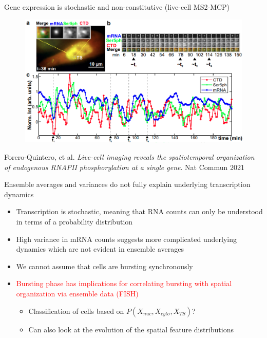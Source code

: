 \documentclass[aspectratio=1610]{beamer}					%
\begin{document}
\begin{frame}{Gene expression is stochastic and non-constitutive (live-cell MS2-MCP)}
\begin{figure}
\includegraphics[width=12cm]{live-cell.png}
\end{figure}
{\tiny Forero-Quintero, et al. \textit{Live-cell imaging reveals the spatiotemporal organization of endogenous RNAPII phosphorylation at a single gene}. Nat Commun 2021}\\
\end{frame}

\begin{frame}{Ensemble averages and variances do not fully explain underlying transcription dynamics}

\begin{itemize}
\item Transcription is stochastic, meaning that RNA counts can only be understood in terms of a probability distribution
\vspace{0.2in}
\item High variance in mRNA counts suggests more complicated underlying dynamics which are not evident in ensemble averages
\vspace{0.2in}
\item We cannot assume that cells are bursting synchronously
\vspace{0.2in}
\item \textcolor{red}{Bursting phase has implications for correlating bursting with spatial organization via ensemble data (FISH)}
\vspace{0.1in}
\begin{itemize}
\item Classification of cells based on $P(X_{nuc},X_{cyto},X_{TS})$?
\item Can also look at the evolution of the spatial feature distributions
\end{itemize}
\end{itemize}

\end{frame}
\end{document}
